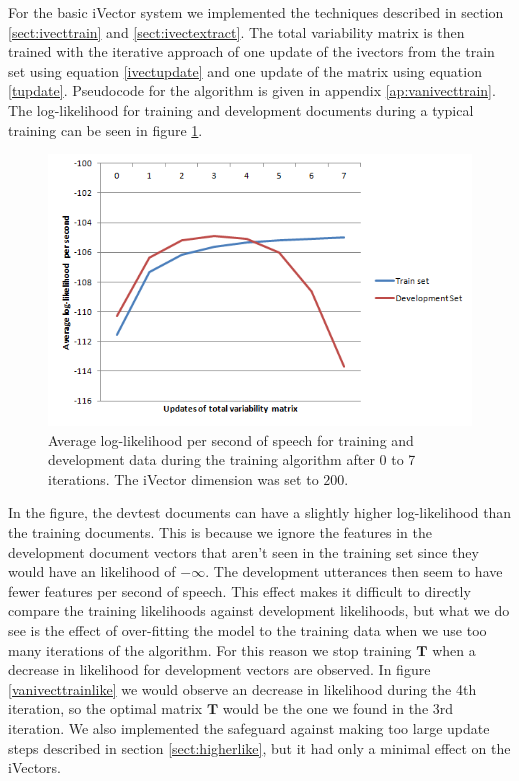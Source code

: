 For the basic iVector system we implemented the techniques described in section \ref{sect:ivecttrain} and \ref{sect:ivectextract}. The total variability matrix is then trained with the iterative approach of one update of the ivectors from the train set using equation \ref{ivectupdate} and one update of the matrix using equation \ref{tupdate}. Pseudocode for the algorithm is given in appendix \ref{ap:vanivecttrain}. The log-likelihood for training and development documents during a typical training can be seen in figure \ref{fig:vanivecttrainlike}. 
\begin{figure}[hbt]
	\begin{center}
	\includegraphics{figures/vanivecttrainlike.png}
	\caption{Average log-likelihood per second of speech for training and development data during the training algorithm after 0 to 7 iterations. The iVector dimension was set to $200$.}
	\label{fig:vanivecttrainlike}
	\end{center}
\end{figure}
In the figure, the devtest documents can have a slightly higher log-likelihood than the training documents. This is because we ignore the features in the development document vectors that aren't seen in the training set since they would have an likelihood of $-\infty$. The development utterances then seem to have fewer features per second of speech. This effect makes it difficult to directly compare the training likelihoods against development likelihoods, but what we do see is the effect of over-fitting the model to the training data when we use too many iterations of the algorithm. For this reason we stop training $\mathbf{T}$ when a decrease in likelihood for development vectors are observed. In figure \ref{vanivecttrainlike} we would observe an decrease in likelihood during the 4th iteration, so the optimal matrix $\mathbf{T}$ would be the one we found in the 3rd iteration. We also implemented the safeguard against making too large update steps described in section \ref{sect:higherlike}, but it had only a minimal effect on the iVectors.

